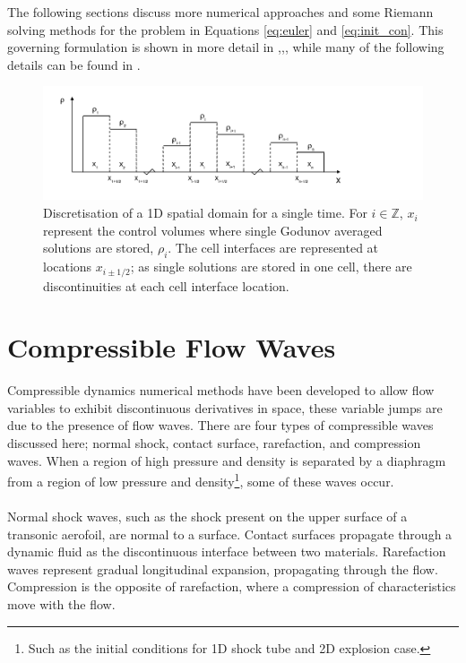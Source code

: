 	The following sections discuss more numerical approaches and some Riemann solving methods for the problem in Equations \ref{eq:euler} and \ref{eq:init_con}. This governing formulation is shown in more detail in \cite{Chung02},\cite{Toro09},\cite{Toro94}, while many of the following details can be found in \cite{TakisNotes}.
	\begin{figure}
    		\centering
        		\includegraphics[trim=20 20 120 10,clip,width=\textwidth]{discretisation.pdf}
		\caption[Approach : 1D finite difference discretisation]{Discretisation of a 1D spatial domain for a single time. For $i\in\mathds{Z}$, $x_i$ represent the control volumes where single Godunov averaged solutions are stored, $\rho_i$. The cell interfaces are represented at locations $x_{i\pm1/2}$; as single solutions are stored in one cell, there are discontinuities at each cell interface location.}
		\label{fig:1d_discretisation}
	\end{figure}
	
\section{Compressible Flow Waves}
\label{sec:waves}

	Compressible dynamics numerical methods have been developed to allow flow variables to exhibit discontinuous derivatives in space, these variable jumps are due to the presence of flow waves. There are four types of compressible waves discussed here; normal shock, contact surface, rarefaction, and compression waves. When a region of high pressure and density is separated by a diaphragm from a region of low pressure and density\footnote{Such as the initial conditions for 1D shock tube and 2D explosion case.}, some of these waves occur. \\ \\
	Normal shock waves, such as the shock present on the upper surface of a transonic aerofoil, are normal to a surface. Contact surfaces propagate through a dynamic fluid as the discontinuous interface between two materials. Rarefaction waves represent gradual longitudinal expansion, propagating through the flow. Compression is the opposite of rarefaction, where a compression of characteristics move with the flow.
	
